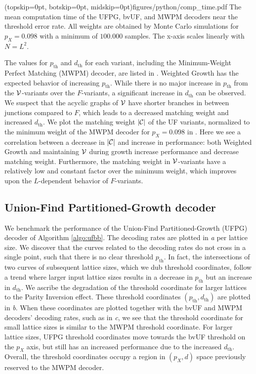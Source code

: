 \Figure[t](topskip=0pt, botskip=0pt, midskip=0pt){figures/python/comp_time.pdf}{
  The mean computation time of the UFPG, bvUF, and MWPM decoders near the threshold error rate. All weights are obtained by Monte Carlo simulations for $p_X=0.098$ with a minimum of $100.000$ samples. The x-axis scales linearly with $N = L^2$.\label{comp_time}}

The values for $p_{\text{th}}$ and $d_{\text{th}}$ for each variant, including the Minimum-Weight Perfect Matching (MWPM) decoder, are listed in . Weighted Growth has the expected behavior of increasing $p_{\text{th}}$. While there is no major increase in $p_{\text{th}}$ from the $\mathcal{V}$-variants over the $F$-variants, a significant increase in $d_{\text{th}}$ can be observed. We suspect that the acyclic graphs of $\mathcal{V}$ have shorter branches in between junctions compared to $F$, which leads to a decreased matching weight and increased $d_{\text{th}}$. We plot the matching weight $\lvert\mathcal{C}\rvert$ of the UF variants, normalized to the minimum weight of the MWPM decoder for $p_X = 0.098$ in . Here we see a correlation between a decrease in $\lvert\mathcal{C}\rvert$ and increase in performance: both Weighted Growth and maintaining $\mathcal{V}$ during growth increase performance and decrease matching weight. Furthermore, the matching weight in $\mathcal{V}$-variants have a relatively low and constant factor over the minimum weight, which improves upon the $L$-dependent behavior of $F$-variants.


\subsection{Union-Find Partitioned-Growth decoder}

We benchmark the performance of the Union-Find Partitioned-Growth (UFPG) decoder of Algorithm \ref{algo:ufbb}. The decoding rates are plotted in \emph{a} per lattice size. We discover that the curves related to the decoding rates do not cross in a single point, such that there is no clear threshold $p_{\text{th}}$. In fact, the intersections of two curves of subsequent lattice sizes, which we dub threshold coordinates, follow a trend where larger input lattice sizes results in a decrease in $p_{\text{th}}$ but an increase in $d_{\text{th}}$. We ascribe the degradation of the threshold coordinate for larger lattices to the Parity Inversion effect. These threshold coordinates $(p_{\text{th}}, d_{\text{th}})$ are plotted in \emph{b}. When these coordinates are plotted together with the bvUF and MWPM decoders' decoding rates, such as in \emph{c}, we see that the threshold coordinate for small lattice sizes is similar to the MWPM threshold coordinate. For larger lattice sizes, UFPG threshold coordinates move towards the bvUF threshold on the $p_X$ axis, but still has an increased performance due to the increased $d_{\text{th}}$. Overall, the threshold coordinates occupy a region in $(p_X, d)$ space previously reserved to the MWPM decoder. 


